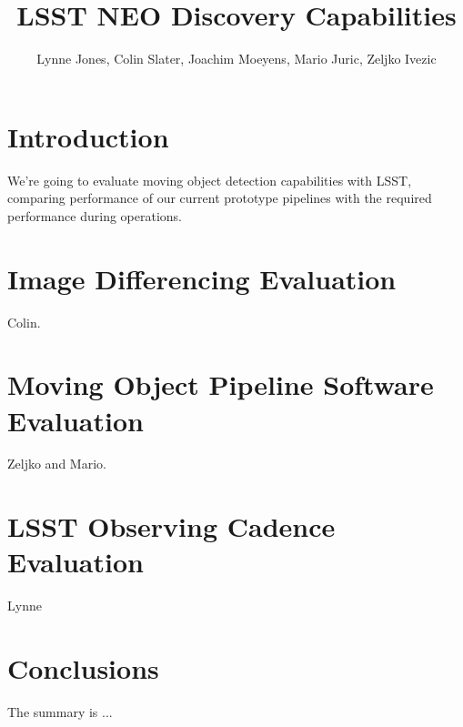 \documentclass[12pt,preprint]{aastex}
\begin{document}
\title{LSST NEO Discovery Capabilities}

\author{Lynne Jones,  Colin Slater, Joachim Moeyens, Mario Juric, Zeljko Ivezic} %
\affil{}

\begin{abstract}

\end{abstract}

\keywords{}

\section{Introduction}

We're going to evaluate moving object detection capabilities with LSST, comparing performance of our current prototype pipelines with the required performance during operations.


\section{Image Differencing Evaluation}

Colin.


\section{Moving Object Pipeline Software Evaluation}

Zeljko and Mario.


\section{LSST Observing Cadence Evaluation}

Lynne

\section{Conclusions}

The summary is ...


\end{document}
